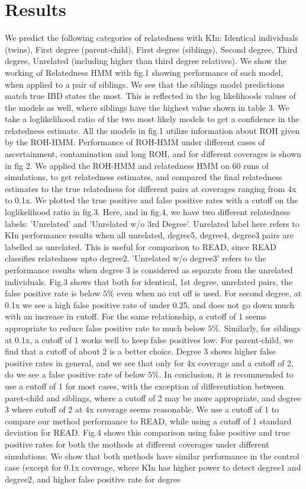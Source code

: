 \documentclass[12pt, letterpaper]{article}
\begin{document}
\section{Results}
\graphicspath{{plots/plotimg/}}
We predict the following categories of relatedness with KIn: Identical individuals (twins), First degree (parent-child), First degree (siblings), Second degree, Third degree, Unrelated (including higher than third degree relatives). We show the working of Relatedness HMM with fig.1 showing performance of each model, when applied to a pair of siblings. We see that the siblings model predictions match true IBD states the most. This is reflected in the log likelihoods values of the models as well, where siblings have the highest value shown in table 3. We take a loglikelihood ratio of the two most likely models to get a confidence in the relatedness estimate. All the models in fig.1 utilize information about ROH given by the ROH-HMM. Performance of ROH-HMM under different cases of ascertainment, contamination and long ROH, and for different coverages is shown in fig 2. We applied the ROH-HMM and relatedness HMM on 60 runs of simulations, to get relatedness estimates, and compared the final relatedness estimates to the true relatedness for different pairs at coverages ranging from 4x to 0.1x. We plotted the true positive and false positive rates with a cutoff on the loglikelihood ratio in fig.3. Here, and in fig.4, we have two different relatedness labels: 'Unrelated' and 'Unrelated w/o 3rd Degree'. Unrelated label here refers to KIn performance results when all unrelated, degree5, degree4, degree3 pairs are labelled as unrelated. This is useful for comparison to READ, since READ classifies relatedness upto degree2. 'Unrelated w/o degree3'  refers to the performance results when degree 3 is considered as separate from the unrelated individuals. Fig.3 shows that both for identical, 1st degree, unrelated pairs, the false positive rate is below $5\%$ even when no cut off is used. For second degree, at 0.1x we see a high false positive rate of under 0.25, and does not go down much with an increase in cutoff. For the same relationship, a cutoff of 1 seems appropriate to reduce false positive rate to much below $5\%$. Similarly, for siblings at 0.1x, a cutoff of 1 works well to keep false positives low. For parent-child, we find that a cutoff of about 2 is a better choice. Degree 3 shows higher false positive rates in general, and we see that only for 4x coverage and a cutoff of 2, do we see a false positive rate of below $5\%$. In conclusion, it is recommended to use a cutoff of 1 for most cases, with the exception of differentiation between paret-child and siblings, where a cutoff of 2 may be more appropriate, and degree 3 where cutoff of 2 at 4x coverage seems reasonable. We use a cutoff of 1 to compare our method performance to READ, while using a cutoff of 1 standard deviation for READ. Fig.4 shows this comparison using false positive and true positive rates for both the mothods at different coverages under different simulations. We show that both methods have similar performance in the control case (except for 0.1x coverage, where KIn has higher power to detect degree1 and degree2, and higher false positive rate for degree 
\end{document}
